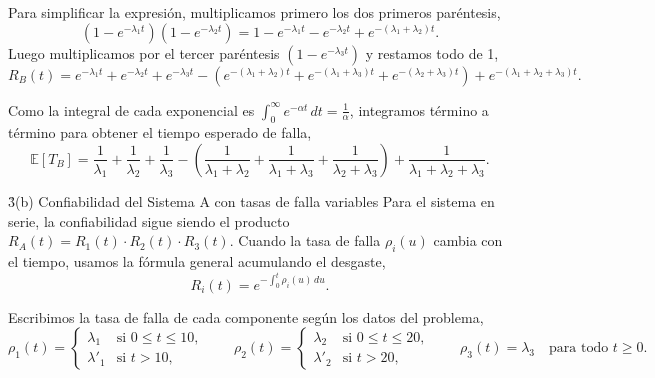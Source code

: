 \documentclass[main.tex]{subfiles}%
\begin{document}
Para simplificar la expresión, multiplicamos primero los dos primeros paréntesis,
\begin{equation*}
    (1 - e^{-\lambda_1 t})(1 - e^{-\lambda_2 t}) = 1 - e^{-\lambda_1 t} - e^{-\lambda_2 t} + e^{-(\lambda_1 + \lambda_2)t}.
\end{equation*}
Luego multiplicamos por el tercer paréntesis $(1 - e^{-\lambda_3 t})$ y restamos todo de 1,
\begin{equation*}
    R_B(t) = e^{-\lambda_1 t} + e^{-\lambda_2 t} + e^{-\lambda_3 t} - \left( e^{-(\lambda_1 + \lambda_2)t} + e^{-(\lambda_1 + \lambda_3)t} + e^{-(\lambda_2 + \lambda_3)t} \right) + e^{-(\lambda_1 + \lambda_2 + \lambda_3)t}.
\end{equation*}

Como la integral de cada exponencial es $\int_0^\infty e^{-\alpha t}\,dt = \frac{1}{\alpha}$, integramos término a término para obtener el tiempo esperado de falla,
\begin{equation*}
    \mathbb{E}[T_B] = \frac{1}{\lambda_1} + \frac{1}{\lambda_2} + \frac{1}{\lambda_3} - \left( \frac{1}{\lambda_1 + \lambda_2} + \frac{1}{\lambda_1 + \lambda_3} + \frac{1}{\lambda_2 + \lambda_3} \right) + \frac{1}{\lambda_1 + \lambda_2 + \lambda_3}.
\end{equation*}

\vspace{4mm}
\h3{(b) Confiabilidad del Sistema A con tasas de falla variables}
Para el sistema en serie, la confiabilidad sigue siendo el producto $R_A(t) = R_1(t) \cdot R_2(t) \cdot R_3(t)$. Cuando la tasa de falla $\rho_i(u)$ cambia con el tiempo, usamos la fórmula general acumulando el desgaste,
\begin{equation*}
    R_i(t) = e^{-\int_0^t \rho_i(u)\,du}.
\end{equation*}

Escribimos la tasa de falla de cada componente según los datos del problema,
\begin{equation*}
    \rho_1(t) = \begin{cases}
        \lambda_1 & \text{si } 0 \le t \le 10, \\[1.5mm]
        \lambda'_1 & \text{si } t > 10,
    \end{cases}
    \qquad
    \rho_2(t) = \begin{cases}
        \lambda_2 & \text{si } 0 \le t \le 20, \\[1.5mm]
        \lambda'_2 & \text{si } t > 20,
    \end{cases}
    \qquad
    \rho_3(t) = \lambda_3 \quad \text{para todo } t \ge 0.
\end{equation*}
\end{document}
